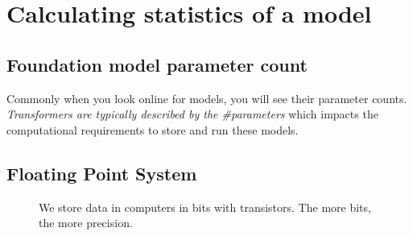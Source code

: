 \documentclass[11pt]{article}
\begin{document}


\tableofcontents

\clearpage

\section{Calculating statistics of a model}

\subsection{Foundation model parameter count}

Commonly when you look online for models, you will see their parameter counts. \emph{Transformers are typically described by the \#parameters} which impacts the computational requirements to store and run these models.

\subsection{Floating Point System}

\begin{figure}[H]
    \centering
    \caption{We store data in computers in bits with transistors. The more bits, the more precision.}
\end{figure}    
\end{document}
